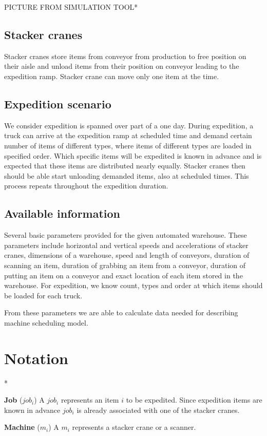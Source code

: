 \documentclass{ctuthesis}
\begin{document}
PICTURE FROM SIMULATION TOOL*
\subsection{Stacker cranes}
Stacker cranes store items from conveyor from production to free position on their aisle and unload items from their position on conveyor leading to the expedition ramp. Stacker crane can move only one item at the time. 

\subsection{Expedition scenario}
We consider expedition is spanned over part of a one day. During expedition, a truck can arrive at the expedition ramp at scheduled time and demand certain number of items of different types, where items of different types are loaded in specified order. Which specific items will be expedited is known in advance and is expected that these items are distributed nearly equally. Stacker cranes then should be able start unloading demanded items, also at scheduled times. This process repeats throughout the expedition duration. 

\subsection{Available information}
Several basic parameters provided for the given automated warehouse. These parameters include horizontal and vertical speeds and accelerations of stacker cranes, dimensions of a warehouse, speed and length of conveyors, duration of scanning an item, duration of grabbing an item from a conveyor, duration of putting an item on a conveyor and exact location of each item stored in the warehouse. For expedition, we know count, types and order at which items should be loaded for each truck. 

From these parameters we are able to calculate data needed for describing machine scheduling model.

\section{Notation}*

\noindent \textbf{Job} ($job_i$) A $job_i$ represents an item $i$ to be expedited. Since expedition items are known in advance $job_i$ is already associated with one of the stacker cranes. 

\noindent \textbf{Machine} ($m_i$) A $m_i$ represents a stacker crane or a scanner. 
\end{document}

